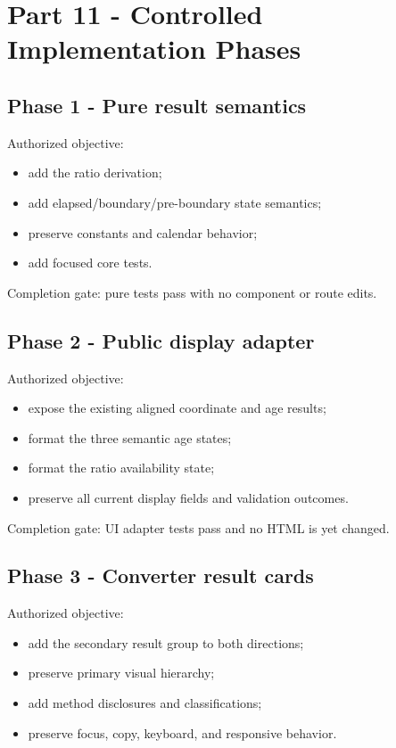 \documentclass[11pt,letterpaper]{article}
\begin{document}
\section{Part 11 - Controlled Implementation Phases}

\subsection{Phase 1 - Pure result semantics}

Authorized objective:

\begin{itemize}
    \item add the ratio derivation;
    \item add elapsed/boundary/pre-boundary state semantics;
    \item preserve constants and calendar behavior;
    \item add focused core tests.
\end{itemize}

Completion gate: pure tests pass with no component or route edits.

\subsection{Phase 2 - Public display adapter}

Authorized objective:

\begin{itemize}
    \item expose the existing aligned coordinate and age results;
    \item format the three semantic age states;
    \item format the ratio availability state;
    \item preserve all current display fields and validation outcomes.
\end{itemize}

Completion gate: UI adapter tests pass and no HTML is yet changed.

\subsection{Phase 3 - Converter result cards}

Authorized objective:

\begin{itemize}
    \item add the secondary result group to both directions;
    \item preserve primary visual hierarchy;
    \item add method disclosures and classifications;
    \item preserve focus, copy, keyboard, and responsive behavior.
\end{itemize}
\end{document}
